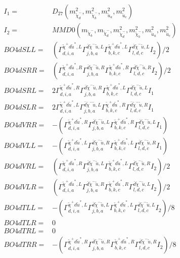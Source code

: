 \documentclass[A4,landscape]{article}
\begin{document}
\begin{align} 
I_1 = & D_{27}(m^2_{\tilde{\chi}^-_{{d}}}, m^2_{\tilde{\chi}^-_{{b}}}, m^2_{\tilde{u}_{{a}}}, m^2_{\tilde{u}_{{c}}}) \\ 
I_2 = & MMD0(m_{\tilde{\chi}^-_{{b}}}, m_{\tilde{\chi}^-_{{d}}}, m^2_{\tilde{\chi}^-_{{d}}}, m^2_{\tilde{\chi}^-_{{b}}}, m^2_{\tilde{u}_{{a}}}, m^2_{\tilde{u}_{{c}}}) \\ 
  BO4dSLL= & ( \Gamma^{\tilde{\chi}^+d \tilde{u}^*,L}_{d, i, a} \Gamma^{\bar{d}\tilde{\chi}^- \tilde{u} ,L}_{j, b, a} \Gamma^{\tilde{\chi}^+d \tilde{u}^*,L}_{b, k, c} \Gamma^{\bar{d}\tilde{\chi}^- \tilde{u} ,L}_{l, d, c} I_2)/2 \\ 
  BO4dSRR= & ( \Gamma^{\tilde{\chi}^+d \tilde{u}^*,R}_{d, i, a} \Gamma^{\bar{d}\tilde{\chi}^- \tilde{u} ,R}_{j, b, a} \Gamma^{\tilde{\chi}^+d \tilde{u}^*,R}_{b, k, c} \Gamma^{\bar{d}\tilde{\chi}^- \tilde{u} ,R}_{l, d, c} I_2)/2 \\ 
  BO4dSRL= & 2  \Gamma^{\tilde{\chi}^+d \tilde{u}^*,R}_{d, i, a} \Gamma^{\bar{d}\tilde{\chi}^- \tilde{u} ,R}_{j, b, a} \Gamma^{\tilde{\chi}^+d \tilde{u}^*,L}_{b, k, c} \Gamma^{\bar{d}\tilde{\chi}^- \tilde{u} ,L}_{l, d, c} I_1 \\ 
  BO4dSLR= & 2  \Gamma^{\tilde{\chi}^+d \tilde{u}^*,L}_{d, i, a} \Gamma^{\bar{d}\tilde{\chi}^- \tilde{u} ,L}_{j, b, a} \Gamma^{\tilde{\chi}^+d \tilde{u}^*,R}_{b, k, c} \Gamma^{\bar{d}\tilde{\chi}^- \tilde{u} ,R}_{l, d, c} I_1 \\ 
  BO4dVRR= & -( \Gamma^{\tilde{\chi}^+d \tilde{u}^*,R}_{d, i, a} \Gamma^{\bar{d}\tilde{\chi}^- \tilde{u} ,L}_{j, b, a} \Gamma^{\tilde{\chi}^+d \tilde{u}^*,R}_{b, k, c} \Gamma^{\bar{d}\tilde{\chi}^- \tilde{u} ,L}_{l, d, c} I_1) \\ 
  BO4dVLL= & -( \Gamma^{\tilde{\chi}^+d \tilde{u}^*,L}_{d, i, a} \Gamma^{\bar{d}\tilde{\chi}^- \tilde{u} ,R}_{j, b, a} \Gamma^{\tilde{\chi}^+d \tilde{u}^*,L}_{b, k, c} \Gamma^{\bar{d}\tilde{\chi}^- \tilde{u} ,R}_{l, d, c} I_1) \\ 
  BO4dVRL= & ( \Gamma^{\tilde{\chi}^+d \tilde{u}^*,R}_{d, i, a} \Gamma^{\bar{d}\tilde{\chi}^- \tilde{u} ,L}_{j, b, a} \Gamma^{\tilde{\chi}^+d \tilde{u}^*,L}_{b, k, c} \Gamma^{\bar{d}\tilde{\chi}^- \tilde{u} ,R}_{l, d, c} I_2)/2 \\ 
  BO4dVLR= & ( \Gamma^{\tilde{\chi}^+d \tilde{u}^*,L}_{d, i, a} \Gamma^{\bar{d}\tilde{\chi}^- \tilde{u} ,R}_{j, b, a} \Gamma^{\tilde{\chi}^+d \tilde{u}^*,R}_{b, k, c} \Gamma^{\bar{d}\tilde{\chi}^- \tilde{u} ,L}_{l, d, c} I_2)/2 \\ 
  BO4dTLL= & -( \Gamma^{\tilde{\chi}^+d \tilde{u}^*,L}_{d, i, a} \Gamma^{\bar{d}\tilde{\chi}^- \tilde{u} ,L}_{j, b, a} \Gamma^{\tilde{\chi}^+d \tilde{u}^*,L}_{b, k, c} \Gamma^{\bar{d}\tilde{\chi}^- \tilde{u} ,L}_{l, d, c} I_2)/8 \\ 
  BO4dTLR= & 0 \\ 
  BO4dTRL= & 0 \\ 
  BO4dTRR= & -( \Gamma^{\tilde{\chi}^+d \tilde{u}^*,R}_{d, i, a} \Gamma^{\bar{d}\tilde{\chi}^- \tilde{u} ,R}_{j, b, a} \Gamma^{\tilde{\chi}^+d \tilde{u}^*,R}_{b, k, c} \Gamma^{\bar{d}\tilde{\chi}^- \tilde{u} ,R}_{l, d, c} I_2)/8 \\ 
\end{align} 
\end{document}
